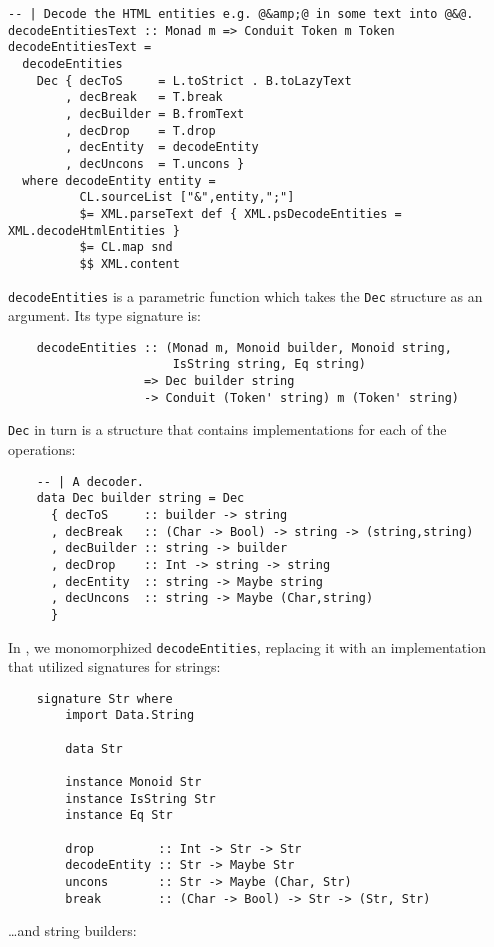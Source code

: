 \begin{lstlisting}
-- | Decode the HTML entities e.g. @&amp;@ in some text into @&@.
decodeEntitiesText :: Monad m => Conduit Token m Token
decodeEntitiesText =
  decodeEntities
    Dec { decToS     = L.toStrict . B.toLazyText
        , decBreak   = T.break
        , decBuilder = B.fromText
        , decDrop    = T.drop
        , decEntity  = decodeEntity
        , decUncons  = T.uncons }
  where decodeEntity entity =
          CL.sourceList ["&",entity,";"]
          $= XML.parseText def { XML.psDecodeEntities = XML.decodeHtmlEntities }
          $= CL.map snd
          $$ XML.content
\end{lstlisting}
%
\verb|decodeEntities| is a parametric function which takes the
\verb|Dec| structure as an argument.  Its type signature is:

\begin{lstlisting}
    decodeEntities :: (Monad m, Monoid builder, Monoid string,
                       IsString string, Eq string)
                   => Dec builder string
                   -> Conduit (Token' string) m (Token' string)
\end{lstlisting}
%
\verb|Dec| in turn is a structure
that contains implementations for each of the operations:

\begin{lstlisting}
    -- | A decoder.
    data Dec builder string = Dec
      { decToS     :: builder -> string
      , decBreak   :: (Char -> Bool) -> string -> (string,string)
      , decBuilder :: string -> builder
      , decDrop    :: Int -> string -> string
      , decEntity  :: string -> Maybe string
      , decUncons  :: string -> Maybe (Char,string)
      }
\end{lstlisting}
%
In \Backpack{}, we monomorphized \verb|decodeEntities|, replacing
it with an implementation that utilized signatures for strings:

\begin{lstlisting}
    signature Str where
        import Data.String

        data Str

        instance Monoid Str
        instance IsString Str
        instance Eq Str

        drop         :: Int -> Str -> Str
        decodeEntity :: Str -> Maybe Str
        uncons       :: Str -> Maybe (Char, Str)
        break        :: (Char -> Bool) -> Str -> (Str, Str)
\end{lstlisting}
%
\ldots{}and string builders:

